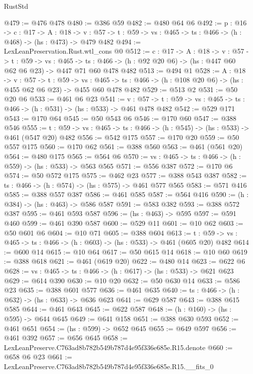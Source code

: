 \begin{lexlean}{RustStd}
\begin{coremodule}
@479 := @476 @478
@480 := @386 @59
@482 := @480 @64 @6
@492 := {p : @16} ->
  {c : @17} ->
  {A : @18} ->
  {v : @57} -> {t : @59} -> {vs : @465} -> {ts : @466} -> (h : @468) -> (hs : @473) -> @479 @482
@494 := LexLeanPreservation.Rust.wtl_cons @0
@512 := {c : @17} ->
  {A : @18} ->
  {v : @57} ->
  {t : @59} ->
  {vs : @465} ->
  {ts : @466} -> (h : @92 @20 @6) -> (hs : @447 @60 @62 @6 @23) -> @447 @71 @60 @478 @482
@513 := @494 @1
@528 := {A : @18} ->
  {v : @57} ->
  {t : @59} ->
  {vs : @465} -> {ts : @466} -> (h : @108 @20 @6) -> (hs : @455 @62 @6 @23) -> @455 @60 @478 @482
@529 := @513 @2
@531 := @50 @20 @6
@533 := @461 @6 @23
@541 := {v : @57} ->
  {t : @59} -> {vs : @465} -> {ts : @466} -> (h : @531) -> (hs : @533) -> @461 @478 @482
@542 := @529 @171
@543 := @170 @64
@545 := @50 @543 @6
@546 := @170 @60
@547 := @388 @546
@555 := {t : @59} -> {vs : @465} -> {ts : @466} -> (h : @545) -> (hs : @533) -> @461 (@547 @20) @482
@556 := @542 @175
@557 := @170 @20
@559 := @50 @557 @175
@560 := @170 @62
@561 := @388 @560
@563 := @461 (@561 @20)
@564 := @480 @175
@565 := @564 @6
@570 := {vs : @465} -> {ts : @466} -> (h : @559) -> (hs : @533) -> @563 @565
@571 := @556 @387
@572 := @170 @6
@574 := @50 @572 @175
@575 := @462 @23
@577 := @388 @543 @387
@582 := {ts : @466} -> (h : @574) -> (hs : @575) -> @461 @577 @565
@583 := @571 @416
@585 := @388 @557 @387
@586 := @461 @585
@587 := @564 @416
@590 := (h : @384) -> (hs : @463) -> @586 @587
@591 := @583 @382
@593 := @388 @572 @387
@595 := @461 @593 @587
@596 := (hs : @463) -> @595
@597 := @591 @460
@599 := @461 @390 @587
@600 := @529 @11
@601 := @10 @62
@603 := @50 @601 @6
@604 := @10 @71
@605 := @388 @604
@613 := {t : @59} -> {vs : @465} -> {ts : @466} -> (h : @603) -> (hs : @533) -> @461 (@605 @20) @482
@614 := @600 @14
@615 := @10 @64
@617 := @50 @615 @14
@618 := @10 @60
@619 := @388 @618
@621 := @461 (@619 @20)
@622 := @480 @14
@623 := @622 @6
@628 := {vs : @465} -> {ts : @466} -> (h : @617) -> (hs : @533) -> @621 @623
@629 := @614 @390
@630 := @10 @20
@632 := @50 @630 @14
@633 := @586 @23
@635 := @388 @601 @577
@636 := @461 @635
@640 := {ts : @466} -> (h : @632) -> (hs : @633) -> @636 @623
@641 := @629 @587
@643 := @388 @615 @585
@644 := @461 @643
@645 := @622 @587
@648 := (h : @160) -> (hs : @595) -> @644 @645
@649 := @641 @158
@651 := @388 @630 @593
@652 := @461 @651
@654 := (hs : @599) -> @652 @645
@655 := @649 @597
@656 := @461 @392
@657 := @656 @645
@658 := LexLeanPreserve.C763ad8b782b549b787d4e95f336e685e.R15.denote
@660 := @658 @6 @23
@661 := LexLeanPreserve.C763ad8b782b549b787d4e95f336e685e.R15.__fits_0

\end{coremodule}
\end{lexlean}
